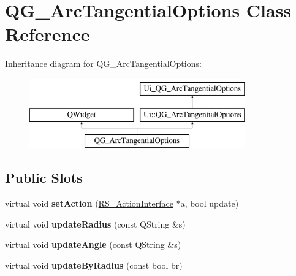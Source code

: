 \hypertarget{classQG__ArcTangentialOptions}{\section{Q\-G\-\_\-\-Arc\-Tangential\-Options Class Reference}
\label{classQG__ArcTangentialOptions}
}
Inheritance diagram for Q\-G\-\_\-\-Arc\-Tangential\-Options\-:\begin{figure}[H]
\begin{center}
\leavevmode
\includegraphics[height=3.000000cm]{classQG__ArcTangentialOptions}
\end{center}
\end{figure}
\subsection*{Public Slots}
\begin{DoxyCompactItemize}
\item 
\hypertarget{classQG__ArcTangentialOptions_a0bdade2a3a347701abd63d5fd9f07dd8}{virtual void {\bfseries set\-Action} (\hyperlink{classRS__ActionInterface}{R\-S\-\_\-\-Action\-Interface} $\ast$a, bool update)}\label{classQG__ArcTangentialOptions_a0bdade2a3a347701abd63d5fd9f07dd8}

\item 
\hypertarget{classQG__ArcTangentialOptions_a09aaaa17f759640ed41751cead3f47c7}{virtual void {\bfseries update\-Radius} (const Q\-String \&s)}\label{classQG__ArcTangentialOptions_a09aaaa17f759640ed41751cead3f47c7}

\item 
\hypertarget{classQG__ArcTangentialOptions_a6e1afc009457fea24dcbe8569858a45b}{virtual void {\bfseries update\-Angle} (const Q\-String \&s)}\label{classQG__ArcTangentialOptions_a6e1afc009457fea24dcbe8569858a45b}

\item 
\hypertarget{classQG__ArcTangentialOptions_a20a6699b1f005cf1a4bd34c68aa434e7}{virtual void {\bfseries update\-By\-Radius} (const bool br)}\label{classQG__ArcTangentialOptions_a20a6699b1f005cf1a4bd34c68aa434e7}

\end{DoxyCompactItemize}
